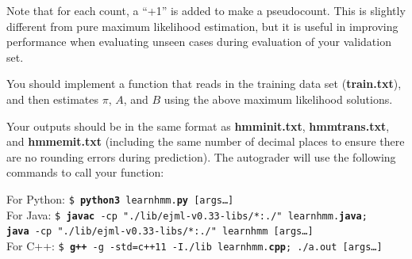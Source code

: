 \documentclass[11pt,addpoints,answers]{exam}
\begin{document}
Note that for each count, a ``+1'' is added to make a pseudocount. This is slightly different from pure maximum likelihood estimation, but it is useful in improving performance when evaluating unseen cases during evaluation of your validation set.

You should implement a function that reads in the training data set (\textbf{train.txt}), and then estimates $\pi$, $A$, and $B$ using the above maximum likelihood solutions. 

Your outputs should be in the same format as \textbf{hmminit.txt}, \textbf{hmmtrans.txt}, and \textbf{hmmemit.txt} (including the same number of decimal places to ensure there are no rounding errors during prediction). The autograder will use the following commands to call your function:

\begin{tabbing}
For Python: \=\texttt{\$ \textbf{python3} learnhmm.\textbf{py} [args\dots]}\\

For Java: \>\texttt{\$ \textbf{javac} -cp "./lib/ejml-v0.33-libs/*:./" learnhmm.\textbf{java};}\\
\>\texttt{\textbf{java} -cp "./lib/ejml-v0.33-libs/*:./" learnhmm [args\dots]}\\

For C++: \>\texttt{\$ \textbf{g++} -g -std=c++11 -I./lib learnhmm.\textbf{cpp}; ./a.out [args\dots]}\\
\end{tabbing}
\end{document}
